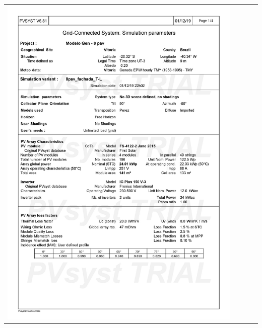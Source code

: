 \begin{table}[H]
    \centering
    \begin{tabular}{l}
        \includegraphics[width=0.9\textwidth]{figures/attachments/resultpv9.jpg}
    \end{tabular}
\end{table}
\pagebreak
